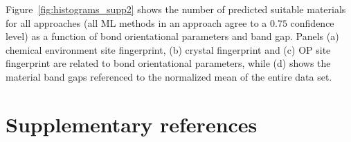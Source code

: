 \documentclass[superscriptaddress,unsortedaddress,
 amsmath,amssymb,
 aps,
]{revtex4-2}
\begin{document}
Figure~\ref{fig:histograms_supp2} shows the number of predicted suitable materials for all approaches (all ML methods in an approach agree to a $0.75$ confidence level) as a function of bond orientational parameters and band gap. 
Panels (a) chemical environment site fingerprint, (b) crystal fingerprint and (c) OP site fingerprint are related to bond orientational parameters, while (d) shows the material band gaps referenced to the normalized mean of the entire data set.  

\newpage 
\section*{Supplementary references}
\end{document}
